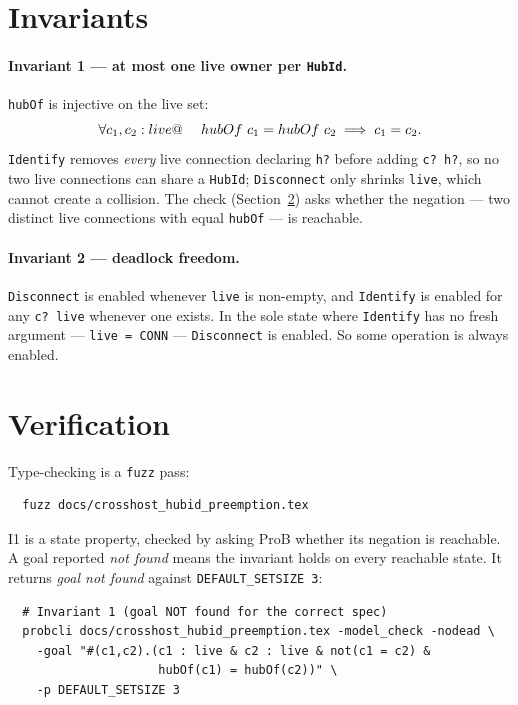\documentclass[a4paper,10pt,fleqn]{article}
\begin{document}
\section{Invariants}
\label{sec:inv}

\paragraph{Invariant 1 --- at most one live owner per \texttt{HubId}.}
\texttt{hubOf} is injective on the live set:
\[
  \forall c_1, c_2 : live @ \\
  \quad~ hubOf~c_1 = hubOf~c_2 \implies c_1 = c_2.
\]
\texttt{Identify} removes \emph{every} live connection declaring
\texttt{h?} before adding \texttt{c? \mapsto h?}, so no two live
connections can share a \texttt{HubId}; \texttt{Disconnect} only shrinks
\texttt{live}, which cannot create a collision.  The check
(Section~\ref{sec:verify}) asks whether the negation --- two distinct live
connections with equal \texttt{hubOf} --- is reachable.

\paragraph{Invariant 2 --- deadlock freedom.}
\texttt{Disconnect} is enabled whenever \texttt{live} is non-empty, and
\texttt{Identify} is enabled for any \texttt{c? \notin live} whenever one
exists.  In the sole state where \texttt{Identify} has no fresh argument
--- \texttt{live = CONN} --- \texttt{Disconnect} is enabled.  So some
operation is always enabled.

\section{Verification}
\label{sec:verify}

Type-checking is a \texttt{fuzz} pass:
\begin{verbatim}
  fuzz docs/crosshost_hubid_preemption.tex
\end{verbatim}

I1 is a state property, checked by asking ProB whether its negation is
reachable.  A goal reported \emph{not found} means the invariant holds on
every reachable state.  It returns \emph{goal not found} against
\texttt{DEFAULT\_SETSIZE 3}:
\begin{verbatim}
  # Invariant 1 (goal NOT found for the correct spec)
  probcli docs/crosshost_hubid_preemption.tex -model_check -nodead \
    -goal "#(c1,c2).(c1 : live & c2 : live & not(c1 = c2) &
                     hubOf(c1) = hubOf(c2))" \
    -p DEFAULT_SETSIZE 3
\end{verbatim}
\end{document}
